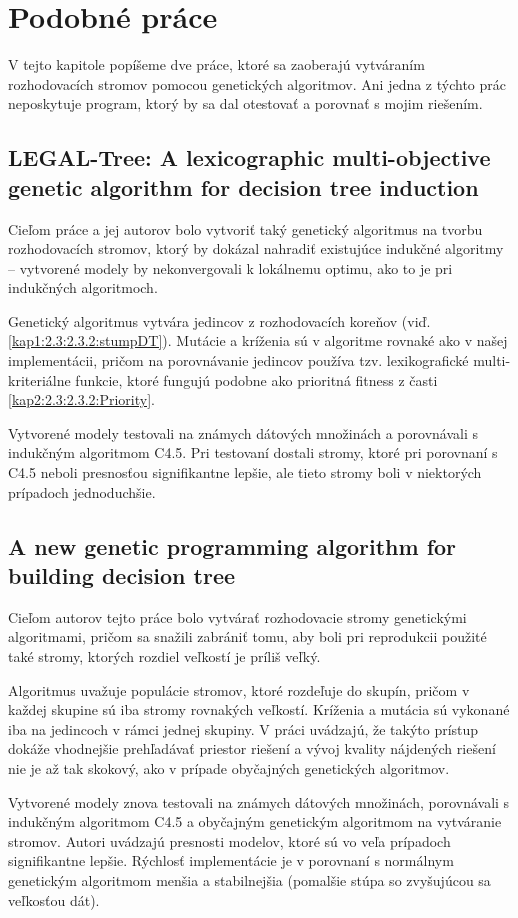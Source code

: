 \chapter{Podobné práce}\label{kap6:SimilarWorks}
V tejto kapitole popíšeme dve práce, ktoré sa zaoberajú vytváraním rozhodovacích stromov pomocou genetických algoritmov. Ani jedna z týchto prác neposkytuje program, ktorý by sa dal otestovať a porovnať s mojim riešením.

\section{LEGAL-Tree: A lexicographic multi-objective genetic algorithm for decision tree induction}\label{kap6: 6.1:Legal}
Cieľom práce a jej autorov \cite{kap6-legal} bolo vytvoriť taký genetický algoritmus na tvorbu rozhodovacích stromov, ktorý by dokázal nahradiť existujúce indukčné algoritmy -- vytvorené modely by nekonvergovali k lokálnemu optimu, ako to je pri indukčných algoritmoch. 

Genetický algoritmus vytvára jedincov z rozhodovacích koreňov (viď. \ref{kap1:2.3:2.3.2:stumpDT}). Mutácie a kríženia sú v algoritme rovnaké ako v našej implementácii, pričom na porovnávanie jedincov používa tzv. lexikografické multi-kriteriálne funkcie, ktoré fungujú podobne ako prioritná fitness z časti \ref{kap2:2.3:2.3.2:Priority}.

Vytvorené modely testovali na známych dátových množinách a porovnávali s indukčným algoritmom C4.5. Pri testovaní dostali stromy, ktoré pri porovnaní s C4.5 neboli presnosťou signifikantne lepšie, ale tieto stromy boli v niektorých prípadoch jednoduchšie.

\section{A new genetic programming algorithm for building decision tree}\label{kap6:6.2:Hybrid}
Cieľom autorov \cite{kap6-group} tejto práce bolo vytvárať rozhodovacie stromy genetickými algoritmami, pričom sa snažili zabrániť tomu, aby boli pri reprodukcii použité také stromy, ktorých rozdiel veľkostí je príliš veľký. 

Algoritmus uvažuje populácie stromov, ktoré rozdeľuje do skupín, pričom v každej skupine sú iba stromy rovnakých veľkostí. Kríženia a mutácia sú vykonané iba na jedincoch v rámci jednej skupiny. V práci uvádzajú, že takýto prístup dokáže vhodnejšie prehľadávať priestor riešení a vývoj kvality nájdených riešení nie je až tak skokový, ako v prípade obyčajných genetických algoritmov.

Vytvorené modely znova testovali na známych dátových množinách, porovnávali s indukčným algoritmom C4.5 a obyčajným genetickým algoritmom na vytváranie stromov. Autori uvádzajú presnosti modelov, ktoré sú vo veľa prípadoch signifikantne lepšie. Rýchlosť implementácie je v porovnaní s normálnym genetickým algoritmom menšia a stabilnejšia (pomalšie stúpa so zvyšujúcou sa veľkosťou dát).

